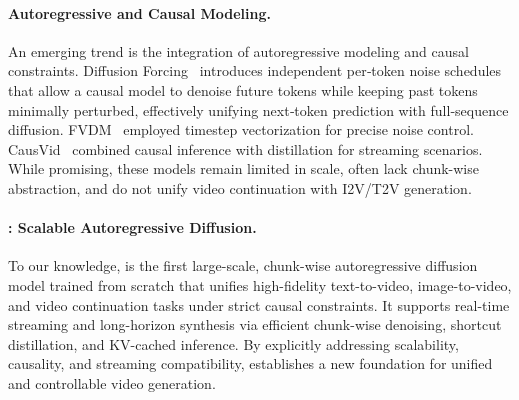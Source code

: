\paragraph{Autoregressive and Causal Modeling.}
An emerging trend is the integration of autoregressive modeling and causal constraints. Diffusion Forcing~\citep{chen2024diffusion} introduces independent per‑token noise schedules that allow a causal model to denoise future tokens while keeping past tokens minimally perturbed, effectively unifying next‑token prediction with full‑sequence diffusion. FVDM~\citep{liu2024redefining} employed timestep vectorization for precise noise control. CausVid~\citep{yin2024slow} combined causal inference with distillation for streaming scenarios. While promising, these models remain limited in scale, often lack chunk-wise abstraction, and do not unify video continuation with I2V/T2V generation.

\paragraph{\magi: Scalable Autoregressive Diffusion.}
To our knowledge, \magi is the first large-scale, chunk-wise autoregressive diffusion model trained from scratch that unifies high-fidelity text-to-video, image-to-video, and video continuation tasks under strict causal constraints. It supports real-time streaming and long-horizon synthesis via efficient chunk-wise denoising, shortcut distillation, and KV-cached inference. By explicitly addressing scalability, causality, and streaming compatibility, \magi establishes a new foundation for unified and controllable video generation.
